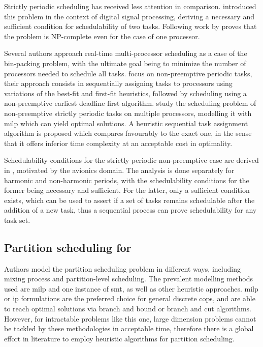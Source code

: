 \documentclass[main.tex]{subfiles}
\begin{document}
Strictly periodic scheduling has received less attention in comparison.
\Textcite{korst1992periodic} introduced this problem in the context of digital signal processing, deriving a necessary and sufficient condition for schedulability of two tasks.
Following work by \textcite{korst1996scheduling} proves that the problem is NP-complete even for the case of one processor.

Several authors \cite{kermia2006non, verschae2010scheduling, mayank2017non, zheng2017scheduling} approach real-time multi-processor scheduling as a case of the bin-packing problem, with the ultimate goal being to minimize the number of processors needed to schedule all tasks.
\Textcite{mayank2017non} focus on non-preemptive periodic tasks, their approach consists in sequentially assigning tasks to processors using variations of the best-fit and first-fit heuristics, followed by scheduling using a non-preemptive earliest deadline first algorithm.
\Textcite{zheng2017scheduling} study the scheduling problem of non-preemptive strictly periodic tasks on multiple processors, modelling it with \gls{milp} which can yield optimal solutions. 
A heuristic sequential task assignment algorithm is proposed which compares favourably to the exact one, in the sense that it offers inferior time complexity at an acceptable cost in optimality.

Schedulability conditions for the strictly periodic non-preemptive case are derived in \textcite{marouf2011scheduling}, motivated by the avionics domain.
The analysis is done separately for harmonic and non-harmonic periods, with the schedulability conditions for the former being necessary and sufficient. 
For the latter, only a sufficient condition exists, which can be used to assert if a set of tasks remains schedulable after the addition of a new task, thus a sequential process can prove schedulability for any task set.

\subsection{Partition scheduling for }

Authors model the partition scheduling problem in different ways, including mixing process and partition-level scheduling. 
The prevalent modelling methods used are \gls{milp} and one instance of \gls{smt}, as well as other heuristic approaches.
\gls{milp} or \gls{ip} formulations are the preferred choice for general discrete \glspl{cop}, and are able to reach optimal solutions via branch and bound or branch and cut algorithms.
However, for intractable problems like this one, large dimension problems cannot be tackled by these methodologies in acceptable time, therefore there is a global effort in literature to employ heuristic algorithms for partition scheduling.
\end{document}
